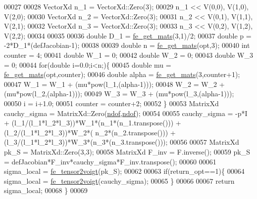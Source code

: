 \begin{DoxyCode}
00027 
00028         VectorXd n\_1 = VectorXd::Zero(3);
00029         n\_1 << V(0,0), V(1,0), V(2,0);
00030         VectorXd n\_2 = VectorXd::Zero(3);
00031         n\_2 << V(0,1), V(1,1), V(2,1);
00032         VectorXd n\_3 = VectorXd::Zero(3);
00033         n\_3 << V(0,2), V(1,2), V(2,2);
00034 
00035 
00036         \textcolor{keywordtype}{double} D\_1 = \hyperlink{functions_8h_af7ffbad6dfcc99fc88b130c1a7b1720a}{fe\_get\_mats}(3,1)/2;
00037         \textcolor{keywordtype}{double} p = -2*D\_1*(defJacobian-1);
00038 
00039         \textcolor{keywordtype}{double} n = \hyperlink{functions_8h_af7ffbad6dfcc99fc88b130c1a7b1720a}{fe\_get\_mats}(opt,3);
00040         \textcolor{keywordtype}{int} counter = 4;
00041         \textcolor{keywordtype}{double} W\_1 = 0;
00042         \textcolor{keywordtype}{double} W\_2 = 0;
00043         \textcolor{keywordtype}{double} W\_3 = 0;
00044         \textcolor{keywordflow}{for}(\textcolor{keywordtype}{double} i=0.0;i<n;)\{
00045             \textcolor{keywordtype}{double} mu = \hyperlink{functions_8h_af7ffbad6dfcc99fc88b130c1a7b1720a}{fe\_get\_mats}(opt,counter);
00046             \textcolor{keywordtype}{double} alpha = \hyperlink{functions_8h_af7ffbad6dfcc99fc88b130c1a7b1720a}{fe\_get\_mats}(3,counter+1);
00047             W\_1 = W\_1 + (mu*pow(l\_1,(alpha-1)));
00048             W\_2 = W\_2 + (mu*pow(l\_2,(alpha-1)));
00049             W\_3 = W\_3 + (mu*pow(l\_3,(alpha-1)));
00050             i = i+1.0;
00051             counter = counter+2;
00052         \}
00053         MatrixXd cauchy\_sigma = MatrixXd::Zero(\hyperlink{_global_variables_8h_aa789fe4d8a13fd0990b630909430d5d0}{ndof},\hyperlink{_global_variables_8h_aa789fe4d8a13fd0990b630909430d5d0}{ndof});
00054 
00055         cauchy\_sigma = -p*I + (l\_1/(l\_1*l\_2*l\_3))*W\_1*(n\_1*(n\_1.transpose())) + (l\_2/(l\_1*l\_2*l\_3))*W\_2*(
      n\_2*(n\_2.transpose())) + (l\_3/(l\_1*l\_2*l\_3))*W\_3*(n\_3*(n\_3.transpose()));
00056 
00057         MatrixXd pk\_S = MatrixXd::Zero(3,3);
00058         MatrixXd F\_inv = F.inverse();
00059         pk\_S = defJacobian*F\_inv*cauchy\_sigma*F\_inv.transpose();
00060 
00061         sigma\_local = \hyperlink{functions_8h_a73c4523ec7068af2af9e8431021f5fdf}{fe\_tensor2voigt}(pk\_S);
00062 
00063         \textcolor{keywordflow}{if}(return\_opt==1)\{
00064             sigma\_local = \hyperlink{functions_8h_a73c4523ec7068af2af9e8431021f5fdf}{fe\_tensor2voigt}(cauchy\_sigma);
00065         \}
00066 
00067     \textcolor{keywordflow}{return} sigma\_local;
00068 \}
00069 
\end{DoxyCode}
